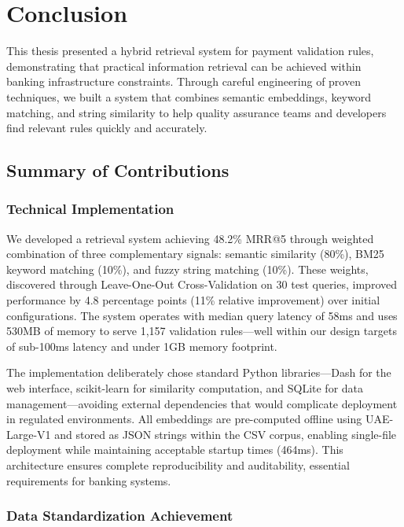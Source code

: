 \chapter{Conclusion}
\label{ch:conclusion}

This thesis presented a hybrid retrieval system for payment validation rules, demonstrating that practical information retrieval can be achieved within banking infrastructure constraints. Through careful engineering of proven techniques, we built a system that combines semantic embeddings, keyword matching, and string similarity to help quality assurance teams and developers find relevant rules quickly and accurately.

\section{Summary of Contributions}

\subsection{Technical Implementation}

We developed a retrieval system achieving 48.2\% MRR@5 through weighted combination of three complementary signals: semantic similarity (80\%), BM25 keyword matching (10\%), and fuzzy string matching (10\%). These weights, discovered through Leave-One-Out Cross-Validation on 30 test queries, improved performance by 4.8 percentage points (11\% relative improvement) over initial configurations. The system operates with median query latency of 58ms and uses 530MB of memory to serve 1,157 validation rules—well within our design targets of sub-100ms latency and under 1GB memory footprint.

The implementation deliberately chose standard Python libraries—Dash for the web interface, scikit-learn for similarity computation, and SQLite for data management—avoiding external dependencies that would complicate deployment in regulated environments. All embeddings are pre-computed offline using UAE-Large-V1 and stored as JSON strings within the CSV corpus, enabling single-file deployment while maintaining acceptable startup times (464ms). This architecture ensures complete reproducibility and auditability, essential requirements for banking systems.

\subsection{Data Standardization Achievement}

